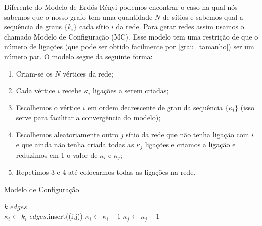 Diferente do Modelo de Erdös-Rényi podemos encontrar o caso na qual nós sabemos que o nosso grafo tem uma quantidade $N$ de sítios e sabemos qual a sequência de graus $\{k_i\}$ cada sítio $i$ da rede. Para gerar redes assim usamos o chamado Modelo de Configuração (MC). Esse modelo tem uma restrição de que o número de ligações (que pode ser obtido facilmente por \ref{grau_tamanho}) ser um número par. O modelo segue da seguinte forma:

\begin{enumerate}
  \item Criam-se os $N$ vértices da rede;
  \item Cada vértice $i$ recebe $\kappa_i$ ligações a serem criadas;
  \item Escolhemos o vértice $i$ em ordem decrescente de grau da sequência $\{\kappa_i\}$ (isso serve para facilitar a convergência do modelo);
  \item Escolhemos aleatoriamente outro $j$ sítio da rede que não tenha ligação com $i$ e que ainda não tenha criada todas as $\kappa_j$ ligações e criamos a ligação e reduzimos em 1 o valor de $\kappa_i$ e $\kappa_j$;
  \item Repetimos 3 e 4 até colocarmos todas as ligações na rede.
\end{enumerate}

\begin{algorithm}

  \caption{Modelo de Configuração}\label{alg:MC}
  \begin{algorithmic}
  \Require $k$ 
  \Require $edges$\\

   
    \State $\kappa_i \gets k_i$
            \State $edges$.insert((i,j))
            \State $\kappa_i \gets \kappa_i - 1$
            \State $\kappa_j \gets \kappa_j - 1$
          \EndIf
      \EndIf
    \EndWhile
  \EndWhile
  \end{algorithmic}

\end{algorithm}

